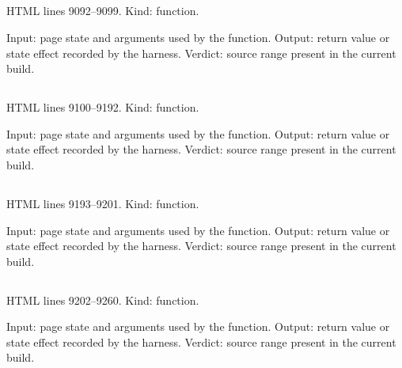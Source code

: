 \subsection*{\texttt{}}
\label{vf_499_quantChannels}
HTML lines 9092--9099. Kind: function.

Input: page state and arguments used by the function.
Output: return value or state effect recorded by the harness.
Verdict: source range present in the current build.

\subsection*{\texttt{}}
\label{vf_500_orphanCurveCandidates}
HTML lines 9100--9192. Kind: function.

Input: page state and arguments used by the function.
Output: return value or state effect recorded by the harness.
Verdict: source range present in the current build.

\subsection*{\texttt{}}
\label{vf_501_reviewOrphanWells}
HTML lines 9193--9201. Kind: function.

Input: page state and arguments used by the function.
Output: return value or state effect recorded by the harness.
Verdict: source range present in the current build.

\subsection*{\texttt{}}
\label{vf_502_reviewForensicEventsCoreUncached}
HTML lines 9202--9260. Kind: function.

Input: page state and arguments used by the function.
Output: return value or state effect recorded by the harness.
Verdict: source range present in the current build.

